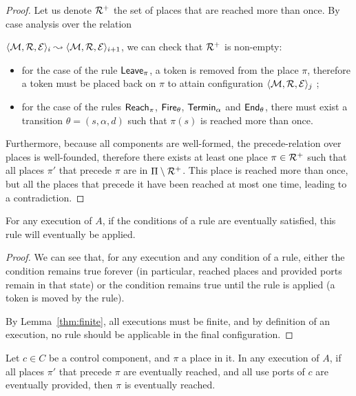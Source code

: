{\begin{proof}
    \noindent Let us denote $\mathcal{R}^+$ the set of places that are reached more
    than once. By case analysis over the relation 
    
    \noindent $\langle \mathcal{M},\mathcal{R}, \mathcal{E} \rangle_i \leadsto \langle \mathcal{M}, \mathcal{R}, \mathcal{E}
    \rangle_{i+1}$, we can check that $\mathcal{R}^+$ is non-empty:
    \begin{itemize}
    \item for the case of the rule $\mathsf{Leave}_\pi$, a token is removed
      from the place $\pi$, therefore a token must be placed back on
      $\pi$ to attain configuration $\langle \mathcal{M}, \mathcal{R}, \mathcal{E}
      \rangle_j$ ;
    \item for the case of the rules $\mathsf{Reach}_\pi$, $\mathsf{Fire}_\theta$,
      $\mathsf{Termin}_\alpha$ and $\mathsf{End}_\theta$, there must exist a transition
      $\theta = (s, \alpha, d)$ such that $\pi(s)$ is reached
      more than once.
    \end{itemize}
    Furthermore, because all components are well-formed, the
    precede-relation over places is well-founded, therefore there
    exists at least one place $\pi \in \mathcal{R}^+$ such that all
    places $\pi'$ that precede $\pi$ are in $\Pi \setminus
    \mathcal{R}^+$. This place is reached more than once, but all the
    places that precede it have been reached at most one time, leading
    to a contradiction.
  \end{proof}

  \begin{lemma}\label{thm:applyrules}
    For any execution of $A$, if the conditions of a rule are
    eventually satisfied, this rule will eventually be applied.
  \end{lemma}

  \begin{proof}
    We can see that, for any execution and any condition of a rule,
    either the condition remains true forever (in particular, reached
    places and provided ports remain in that state) or the condition
    remains true until the rule is applied (\eg a token is moved by
    the rule).

    By Lemma~\ref{thm:finite}, all executions must be finite, and by
    definition of an execution, no rule should be applicable in the
    final configuration.
  \end{proof}

  \begin{lemma}\label{thm:reachedplaces}
    Let $c \in C$ be a control component, and $\pi$ a place in it. In any
    execution of $A$, if all places $\pi'$ that precede $\pi$ are
    eventually reached, and all use ports of $c$ are eventually
    provided, then $\pi$ is eventually reached.
  \end{lemma}

}
